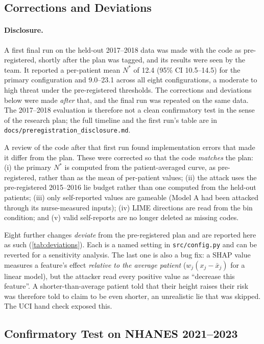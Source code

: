 \documentclass[12pt, a4paper, oneside]{report}
\theoremstyle{definition}
\begin{document}
\subsection{Corrections and Deviations}
\label{sec:deviations}

\paragraph{Disclosure.} A first final run on the held-out 2017--2018
data was made with the code as pre-registered, shortly after the plan
was tagged, and its results were seen by the team. It reported a
per-patient mean $N^*$ of 12.4 (95\% CI 10.5--14.5) for the primary
configuration and 9.0--23.1 across all eight configurations, a moderate
to high threat under the pre-registered thresholds. The corrections and
deviations below were made \emph{after} that, and the final run was
repeated on the same data. The 2017--2018 evaluation is therefore not a
clean confirmatory test in the sense of the research plan; the full
timeline and the first run's table are in
\texttt{docs/preregistration\_disclosure.md}.

A review of the code after that first run found implementation errors
that made it differ from the plan. These were corrected so that the
code \emph{matches} the plan: (i) the primary $N^*$ is computed from
the patient-averaged curve, as pre-registered, rather than as the mean
of per-patient values; (ii) the attack uses the pre-registered
2015--2016 lie budget rather than one computed from the held-out
patients; (iii) only self-reported values are gameable (Model A had
been attacked through its nurse-measured inputs); (iv) LIME directions
are read from the bin condition; and (v) valid self-reports are no
longer deleted as missing codes.

Eight further changes \emph{deviate} from the pre-registered plan and are
reported here as such (\cref{tab:deviations}). Each is a named setting
in \texttt{src/config.py} and can be reverted for a sensitivity analysis.
The last one is also a bug fix: a SHAP value measures a feature's effect
\emph{relative to the average patient} ($w_j(x_j-\bar x_j)$ for a linear
model), but the attacker read every positive value as ``decrease this
feature''. A shorter-than-average patient told that their height raises
their risk was therefore told to claim to be even shorter, an
unrealistic lie that was skipped. The UCI hand check exposed this.

\subsection{Confirmatory Test on NHANES 2021--2023}
\label{sec:confirmatory}
\end{document}
